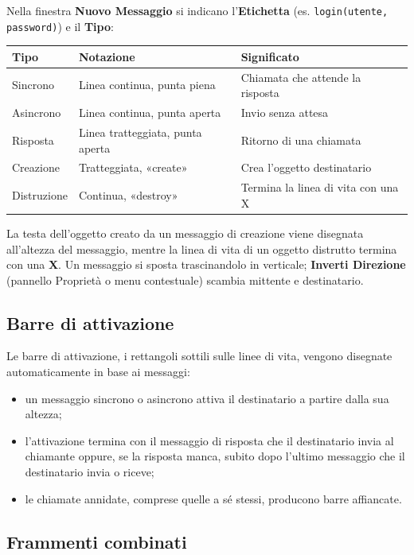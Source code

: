 \documentclass[a4paper,11pt]{article}
\newcommand{\uielement}[1]{\textbf{#1}}
\begin{document}
Nella finestra \uielement{Nuovo Messaggio} si indicano l'\textbf{Etichetta} (es.\@
\texttt{login(utente, password)}) e il \textbf{Tipo}:

\begin{center}
\begin{tabular}{@{}lll@{}}
  \toprule
  \textbf{Tipo} & \textbf{Notazione} & \textbf{Significato} \\
  \midrule
  Sincrono    & Linea continua, punta piena      & Chiamata che attende la risposta \\
  Asincrono   & Linea continua, punta aperta     & Invio senza attesa \\
  Risposta    & Linea tratteggiata, punta aperta & Ritorno di una chiamata \\
  Creazione   & Tratteggiata, «create»           & Crea l'oggetto destinatario \\
  Distruzione & Continua, «destroy»              & Termina la linea di vita con una X \\
  \bottomrule
\end{tabular}
\end{center}

La testa dell'oggetto creato da un messaggio di creazione viene disegnata all'altezza del
messaggio, mentre la linea di vita di un oggetto distrutto termina con una \textbf{X}.
Un messaggio si sposta trascinandolo in verticale; \uielement{Inverti Direzione} (pannello
Proprietà o menu contestuale) scambia mittente e destinatario.

\subsection{Barre di attivazione}

Le barre di attivazione, i rettangoli sottili sulle linee di vita, vengono disegnate
automaticamente in base ai messaggi:
\begin{itemize}
  \item un messaggio sincrono o asincrono attiva il destinatario a partire dalla sua altezza;
  \item l'attivazione termina con il messaggio di risposta che il destinatario invia al
        chiamante oppure, se la risposta manca, subito dopo l'ultimo messaggio che il
        destinatario invia o riceve;
  \item le chiamate annidate, comprese quelle a sé stessi, producono barre affiancate.
\end{itemize}

\subsection{Frammenti combinati}
\end{document}

